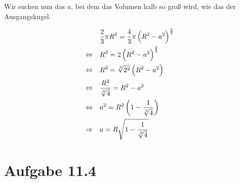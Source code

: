 \documentclass[a4paper,german,12pt,smallheadings]{scrartcl}
\begin{document}
Wir suchen nun das $a$, bei dem das Volumen halb so groß wird, wie das der
Ausgangskugel.

\begin{align*}
  &\frac{2}{3} \pi R^3 = \frac{4}{3}\pi \del{R^2 - a^2}^\frac{3}{2} \\
  \Leftrightarrow \quad&
  R^3 = 2 \del{R^2 - a^2}^\frac{3}{2} \\
  \Leftrightarrow \quad&
  R^2 = \sqrt[3]{2^2} \del{R^2 - a^2} \\
  \Leftrightarrow \quad&
  \frac{R^2}{\sqrt[3]{4}} = {R^2 - a^2} \\
  \Leftrightarrow \quad&
  a^2 = R^2 \del{1 - \frac{1}{\sqrt[3]{4}}} \\
  \Rightarrow \quad&
  a = R \sqrt{1 - \frac{1}{\sqrt[3]{4}}} \\
\end{align*}

\section*{Aufgabe 11.4}
\end{document}
